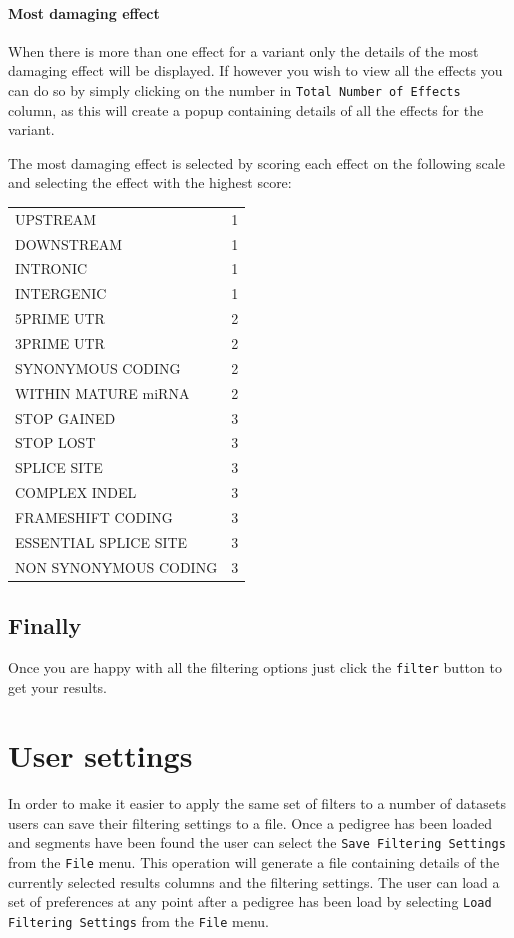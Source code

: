 \documentclass{article}
\begin{document}
	\paragraph{Most damaging effect}	
	When there is more than one effect for a variant only the details of the most damaging effect will be displayed. If however you wish to view all the effects you can do so by simply clicking on the number in \texttt{Total Number of Effects} column, as this will create a popup containing details of all the effects for the variant.
	
	The most damaging effect is selected by scoring each effect on the following scale and selecting the effect with the highest score:\\

\begin{tabular}{ l c }
UPSTREAM & 1\\
DOWNSTREAM & 1\\
INTRONIC & 1\\
INTERGENIC & 1\\	
5PRIME UTR	& 2\\
3PRIME UTR	& 2\\
SYNONYMOUS CODING & 2\\
WITHIN MATURE miRNA & 2\\
STOP GAINED & 3\\
STOP LOST & 3\\
SPLICE SITE	& 3\\
COMPLEX INDEL & 3\\
FRAMESHIFT CODING & 3\\
ESSENTIAL SPLICE SITE & 3\\
NON SYNONYMOUS CODING & 3\\
\end{tabular}

\subsection{Finally}
Once you are happy with all the filtering options just click the \texttt{filter} button to get your results.

\section{User settings}

In order to make it easier to apply the same set of filters to a number of datasets users can save their filtering settings to a file. Once a pedigree has been loaded and segments have been found the user can select the \texttt{Save Filtering Settings} from the \texttt{File} menu. This operation will generate a file containing details of the currently selected results columns and the filtering settings. The user can load a set of preferences at any point after a pedigree has been load by selecting \texttt{Load Filtering Settings} from the \texttt{File} menu.
\end{document}
